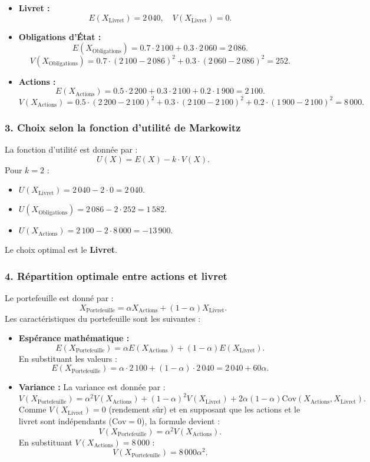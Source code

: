 \documentclass[12pt,a4paper]{article}
\begin{document}
\begin{itemize}
	\item \textbf{Livret :}
	\[
	E(X_{\text{Livret}}) = 2\,040, \quad V(X_{\text{Livret}}) = 0.
	\]
	
	\item \textbf{Obligations d’État :}
	\[
	E(X_{\text{Obligations}}) = 0.7 \cdot 2\,100 + 0.3 \cdot 2\,060 = 2\,086.
	\]
	\[
	V(X_{\text{Obligations}}) = 0.7 \cdot (2\,100 - 2\,086)^2 + 0.3 \cdot (2\,060 - 2\,086)^2 = 252.
	\]
	
	\item \textbf{Actions :}
	\[
	E(X_{\text{Actions}}) = 0.5 \cdot 2\,200 + 0.3 \cdot 2\,100 + 0.2 \cdot 1\,900 = 2\,100.
	\]
	\[
	V(X_{\text{Actions}}) = 0.5 \cdot (2\,200 - 2\,100)^2 + 0.3 \cdot (2\,100 - 2\,100)^2 + 0.2 \cdot (1\,900 - 2\,100)^2 = 8\,000.
	\]
\end{itemize}

\subsubsection*{3. Choix selon la fonction d’utilité de Markowitz}

La fonction d’utilité est donnée par :
\[
U(X) = E(X) - k \cdot V(X).
\]
Pour \(k = 2\) :
\begin{itemize}
	\item \(U(X_{\text{Livret}}) = 2\,040 - 2 \cdot 0 = 2\,040.\)
	\item \(U(X_{\text{Obligations}}) = 2\,086 - 2 \cdot 252 = 1\,582.\)
	\item \(U(X_{\text{Actions}}) = 2\,100 - 2 \cdot 8\,000 = -13\,900.\)
\end{itemize}
Le choix optimal est le \textbf{Livret}.

\subsubsection*{4. Répartition optimale entre actions et livret}

Le portefeuille est donné par :
\[
X_{\text{Portefeuille}} = \alpha X_{\text{Actions}} + (1-\alpha) X_{\text{Livret}}.
\]
Les caractéristiques du portefeuille sont les suivantes :
\begin{itemize}
	\item \textbf{Espérance mathématique :}
	\[
	E(X_{\text{Portefeuille}}) = \alpha E(X_{\text{Actions}}) + (1-\alpha) E(X_{\text{Livret}}).
	\]
	En substituant les valeurs :
	\[
	E(X_{\text{Portefeuille}}) = \alpha \cdot 2\,100 + (1-\alpha) \cdot 2\,040 = 2\,040 + 60\alpha.
	\]
	
	\item \textbf{Variance :}
	La variance est donnée par :
	\[
	V(X_{\text{Portefeuille}}) = \alpha^2 V(X_{\text{Actions}}) + (1-\alpha)^2 V(X_{\text{Livret}}) + 2\alpha(1-\alpha)\text{Cov}(X_{\text{Actions}}, X_{\text{Livret}}).
	\]
	Comme \(V(X_{\text{Livret}}) = 0\) (rendement sûr) et en supposant que les actions et le livret sont indépendants (\(\text{Cov} = 0\)), la formule devient :
	\[
	V(X_{\text{Portefeuille}}) = \alpha^2 V(X_{\text{Actions}}).
	\]
	En substituant \(V(X_{\text{Actions}}) = 8\,000\) :
	\[
	V(X_{\text{Portefeuille}}) = 8\,000 \alpha^2.
	\]
\end{itemize}
\end{document}
